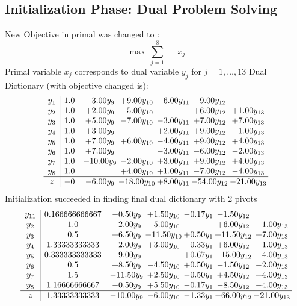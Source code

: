 \documentclass[9pt]{article}
\begin{document}
\subsection{Initialization Phase: Dual Problem Solving}
New Objective in primal was changed to : \[ \max\ \sum_{j=1}^{8}\ - x_j \] 
Primal variable $x_j$ corresponds to dual variable $y_j$ for $j = 1,\ldots,13$
Dual Dictionary (with objective changed is): 
\[\begin{array}{c| c c@{\hskip 2pt} c@{\hskip 2pt} c@{\hskip 2pt} c@{\hskip 2pt} c@{\hskip 2pt} }
 y_{1}   &  1.0 & -3.00 y_{9} & +  9.00 y_{10} & -6.00 y_{11} & -9.00 y_{12} &   \\
 y_{2}   &  1.0 & +  2.00 y_{9} & -5.00 y_{10} &   & +  6.00 y_{12} & +  1.00 y_{13}\\
 y_{3}   &  1.0 & +  5.00 y_{9} & -7.00 y_{10} & -3.00 y_{11} & +  7.00 y_{12} & +  7.00 y_{13}\\
 y_{4}   &  1.0 & +  3.00 y_{9} &   & +  2.00 y_{11} & +  9.00 y_{12} & -1.00 y_{13}\\
 y_{5}   &  1.0 & +  7.00 y_{9} & +  6.00 y_{10} & -4.00 y_{11} & +  9.00 y_{12} & +  4.00 y_{13}\\
 y_{6}   &  1.0 & +  7.00 y_{9} &   & -3.00 y_{11} & -6.00 y_{12} & -2.00 y_{13}\\
 y_{7}   &  1.0 & -10.00 y_{9} & -2.00 y_{10} & +  3.00 y_{11} & +  9.00 y_{12} & +  4.00 y_{13}\\
 y_{8}   &  1.0  &   & +  4.00 y_{10} & +  1.00 y_{11} & -7.00 y_{12} & -4.00 y_{13}\\
\hline
z    &  -0 & -6.00 y_{9} & -18.00 y_{10} & +  8.00 y_{11} & -54.00 y_{12} & -21.00 y_{13}\\
\end{array}\]
Initialization succeeded in finding final dual dictionary with 2 pivots
\[\begin{array}{c| c c@{\hskip 2pt} c@{\hskip 2pt} c@{\hskip 2pt} c@{\hskip 2pt} c@{\hskip 2pt} }
 y_{11}   &  0.166666666667 & -0.50 y_{9} & +  1.50 y_{10} & -0.17 y_{1} & -1.50 y_{12} &   \\
 y_{2}   &  1.0 & +  2.00 y_{9} & -5.00 y_{10} &   & +  6.00 y_{12} & +  1.00 y_{13}\\
 y_{3}   &  0.5 & +  6.50 y_{9} & -11.50 y_{10} & +  0.50 y_{1} & + 11.50 y_{12} & +  7.00 y_{13}\\
 y_{4}   &  1.33333333333 & +  2.00 y_{9} & +  3.00 y_{10} & -0.33 y_{1} & +  6.00 y_{12} & -1.00 y_{13}\\
 y_{5}   &  0.333333333333 & +  9.00 y_{9} &   & +  0.67 y_{1} & + 15.00 y_{12} & +  4.00 y_{13}\\
 y_{6}   &  0.5 & +  8.50 y_{9} & -4.50 y_{10} & +  0.50 y_{1} & -1.50 y_{12} & -2.00 y_{13}\\
 y_{7}   &  1.5 & -11.50 y_{9} & +  2.50 y_{10} & -0.50 y_{1} & +  4.50 y_{12} & +  4.00 y_{13}\\
 y_{8}   &  1.16666666667 & -0.50 y_{9} & +  5.50 y_{10} & -0.17 y_{1} & -8.50 y_{12} & -4.00 y_{13}\\
\hline
z    &  1.33333333333 & -10.00 y_{9} & -6.00 y_{10} & -1.33 y_{1} & -66.00 y_{12} & -21.00 y_{13}\\
\end{array}\]
\end{document}
